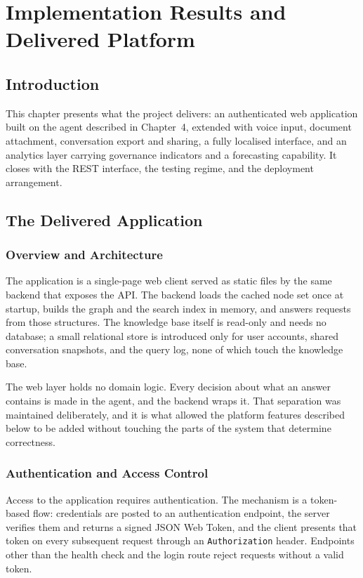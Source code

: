 \chapter{Implementation Results and Delivered Platform}

\section*{Introduction}

This chapter presents what the project delivers: an authenticated web application built on the agent described in Chapter~4, extended with voice input, document attachment, conversation export and sharing, a fully localised interface, and an analytics layer carrying governance indicators and a forecasting capability. It closes with the REST interface, the testing regime, and the deployment arrangement.

\section{The Delivered Application}

\subsection{Overview and Architecture}

The application is a single-page web client served as static files by the same backend that exposes the API. The backend loads the cached node set once at startup, builds the graph and the search index in memory, and answers requests from those structures. The knowledge base itself is read-only and needs no database; a small relational store is introduced only for user accounts, shared conversation snapshots, and the query log, none of which touch the knowledge base.

The web layer holds no domain logic. Every decision about what an answer contains is made in the agent, and the backend wraps it. That separation was maintained deliberately, and it is what allowed the platform features described below to be added without touching the parts of the system that determine correctness.

\subsection{Authentication and Access Control}

Access to the application requires authentication. The mechanism is a token-based flow: credentials are posted to an authentication endpoint, the server verifies them and returns a signed JSON Web Token, and the client presents that token on every subsequent request through an \texttt{Authorization} header. Endpoints other than the health check and the login route reject requests without a valid token.

